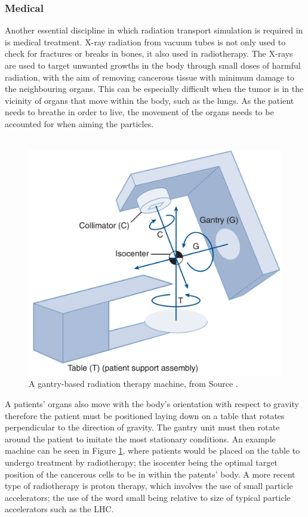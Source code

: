 \documentclass[12pt,a4paper]{article}
\begin{document}
\subsubsection{Medical}
\noindent Another essential discipline in which radiation transport simulation is required in is medical treatment. X-ray radiation from vacuum tubes is not only used to check for fractures or breaks in bones, it also used in radiotherapy. The X-rays are used to target unwanted growths in the body through small doses of harmful radiation, with the aim of removing cancerous tissue with minimum damage to the neighbouring organs. This can be especially difficult when the tumor is in the vicinity of organs that move within the body, such as the lungs. As the patient needs to breathe in order to live, the movement of the organs needs to be accounted for when aiming the particles.
\\\\
\begin{figure}[h!]
\centering
\includegraphics[scale=0.35]{Images//introduction//radiotherapy.png}
\caption[width=\columnwidth]{A gantry-based radiation therapy machine, from Source \cite{cancer}.}
\label{cancer}
\end{figure}

\noindent A patients' organs also move with the body's orientation with respect to gravity therefore the patient must be positioned laying down on a table that rotates perpendicular to the direction of gravity. The gantry unit must then rotate around the patient to imitate the most stationary conditions. An example machine can be seen in Figure \ref{cancer}, where patients would be placed on the table to undergo treatment by radiotherapy; the isocenter being the optimal target position of the cancerous cells to be in within the patents' body.  A more recent type of radiotherapy is proton therapy, which involves the use of small particle accelerators; the use of the word small being relative to size of typical particle accelerators such as the LHC.
\end{document}
